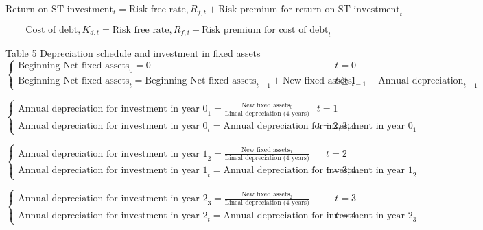\documentclass[12pt]{article}
\numberwithin{equation}{section}
\begin{document}
\begin{equation}
	\text{Return on ST investment}_{t} = \text{Risk free rate}, R_{f,t} + \text{Risk premium for return on ST investment}_{t}
\end{equation}

\begin{equation}
	\text{Cost of debt}, K_{d,t} = \text{Risk free rate}, R_{f,t} + \text{Risk premium for cost of debt}_{t}
\end{equation}

Table 5 Depreciation schedule and investment in fixed assets
\begin{equation}
	\begin{cases}
		\text{Beginning Net fixed assets}_{0} = 0 & t=0 \\
		\text{Beginning Net fixed assets}_{t} = \text{Beginning Net fixed assets}_{t-1} + \text{New fixed assets}_{t-1} - \text{Annual depreciation}_{t-1} & t\geq1
	\end{cases}
\end{equation}

\begin{equation}
	\begin{cases}
		\text{Annual depreciation for investment in year 0}_{1} = \frac{\text{New fixed assets}_{0}}{\text{Lineal depreciation (4 years)}} & t=1 \\
		\text{Annual depreciation for investment in year 0}_{t} = \text{Annual depreciation for investment in year 0}_{1}&t=2,3,4
	\end{cases}
\end{equation}

\begin{equation}
	\begin{cases}
		\text{Annual depreciation for investment in year 1}_{2} = \frac{\text{New fixed assets}_{1}}{\text{Lineal depreciation (4 years)}} & t=2 \\
		\text{Annual depreciation for investment in year 1}_{t} = \text{Annual depreciation for investment in year 1}_{2}&t=3,4
	\end{cases}
\end{equation}

\begin{equation}
	\begin{cases}
		\text{Annual depreciation for investment in year 2}_{3} = \frac{\text{New fixed assets}_{2}}{\text{Lineal depreciation (4 years)}} & t=3 \\
		\text{Annual depreciation for investment in year 2}_{t} = \text{Annual depreciation for investment in year 2}_{3}&t=4
	\end{cases}
\end{equation}
\end{document}
